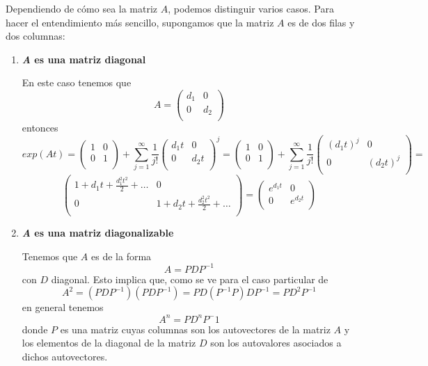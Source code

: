Dependiendo de cómo sea la matriz $A$, podemos distinguir varios casos. Para hacer el entendimiento más sencillo, supongamos que la matriz $A$ es de dos filas y dos columnas:

\begin{enumerate}
\item \textbf{\textit{A} es una matriz diagonal}

En este caso tenemos que $$A = \begin{pmatrix}
d_1 & 0\\0 & d_2\\
\end{pmatrix}$$
entonces $$exp(At) = \begin{pmatrix}
1 & 0\\ 0 & 1\\
\end{pmatrix} + \sum_{j=1}^\infty \frac{1}{j!} \begin{pmatrix}
d_1t & 0\\ 0 & d_2t\\
\end{pmatrix}^j = \begin{pmatrix}
1 & 0\\ 0 & 1\\
\end{pmatrix} + \sum_{j=1}^\infty \frac{1}{j!} \begin{pmatrix}
(d_1t)^j & 0\\ 0 & (d_2t)^j\\
\end{pmatrix} = $$
$$\begin{pmatrix}
1+d_1t+\frac{d_1^2t^2}{2}+\hdots & 0\\
0 & 1+d_2t+\frac{d_2^2t^2}{2}+\hdots\\
\end{pmatrix} = \begin{pmatrix}
e^{d_1t} & 0\\ 0 & e^{d_2t}\\
\end{pmatrix}$$

\item \textbf{\textit{A} es una matriz diagonalizable}

Tenemos que $A$ es de la forma $$A = PDP^{-1}$$ con $D$ diagonal. Esto implica que, como se ve para el caso particular de $$A^2 = (PDP^{-1})(PDP^{-1}) = PD(P^{-1}P)DP^{-1} = PD^2P^{-1}$$ en general tenemos $$A^n = PD^nP^-1$$ donde $P$ es una matriz cuyas columnas son los autovectores de la matriz $A$ y los elementos de la diagonal de la matriz $D$ son los autovalores asociados a dichos autovectores.


\end{enumerate}
